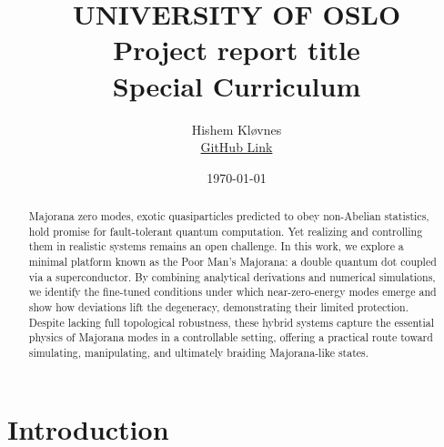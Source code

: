\documentclass[11pt, letterpaper, titlepage]{article}
\title{
 \textbf{\LARGE UNIVERSITY OF OSLO} \\
\vspace{37mm}
\textbf{\Large Project report title}\\
\vspace{7mm}
\Large Special Curriculum \\
\vspace{25mm}
}
\author{\Large Hishem Kløvnes \\ \textcolor{blue}{\href{https://github.com/hishemok/Special_curriculum}{GitHub Link} }}
\date{\Large \today} %
\begin{document}
\sloppy
\maketitle
\newpage

\begin{abstract}
  Majorana zero modes, exotic quasiparticles predicted to obey non-Abelian statistics, hold promise for fault-tolerant quantum computation. Yet realizing and controlling them in realistic systems remains an open challenge. In this work, we explore a minimal platform known as the Poor Man’s Majorana: a double quantum dot coupled via a superconductor. By combining analytical derivations and numerical simulations, we identify the fine-tuned conditions under which near-zero-energy modes emerge and show how deviations lift the degeneracy, demonstrating their limited protection. Despite lacking full topological robustness, these hybrid systems capture the essential physics of Majorana modes in a controllable setting, offering a practical route toward simulating, manipulating, and ultimately braiding Majorana-like states.
\end{abstract}

\tableofcontents
\newpage
\section{Introduction}
\end{document}
